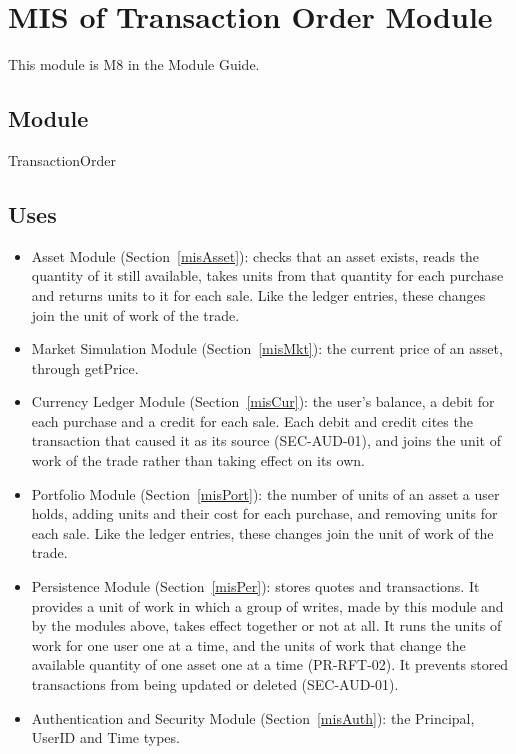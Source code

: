 \documentclass[12pt, titlepage]{article}
\begin{document}
\section{MIS of Transaction Order Module} \label{misPurch}

This module is M8 in the Module Guide.

\subsection{Module}

TransactionOrder

\subsection{Uses}

\begin{itemize}
\item Asset Module (Section~\ref{misAsset}): checks that an asset exists,
  reads the quantity of it still available, takes units from that quantity
  for each purchase and returns units to it for each sale. Like the ledger
  entries, these changes join the unit of work of the trade.
\item Market Simulation Module (Section~\ref{misMkt}): the current price of
  an asset, through getPrice.
\item Currency Ledger Module (Section~\ref{misCur}): the user's balance, a
  debit for each purchase and a credit for each sale. Each debit and credit
  cites the transaction that caused it as its source (SEC-AUD-01), and joins
  the unit of work of the trade rather than taking effect on its own.
\item Portfolio Module (Section~\ref{misPort}): the number of units of an
  asset a user holds, adding units and their cost for each purchase, and
  removing units for each sale. Like the ledger entries, these changes join
  the unit of work of the trade.
\item Persistence Module (Section~\ref{misPer}): stores quotes and
  transactions. It provides a unit of work in which a group of writes, made
  by this module and by the modules above, takes effect together or not at
  all. It runs the units of work for one user one at a time, and the units
  of work that change the available quantity of one asset one at a time
  (PR-RFT-02). It
  prevents stored transactions from being updated or deleted (SEC-AUD-01).
\item Authentication and Security Module (Section~\ref{misAuth}): the
  Principal, UserID and Time types.
\end{itemize}
\end{document}

